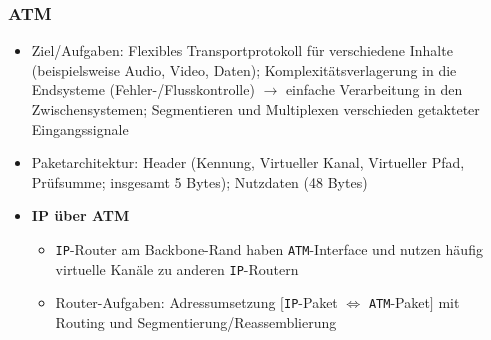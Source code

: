 \subsubsection{ATM}
\begin{itemize}
	\item Ziel/Aufgaben: Flexibles Transportprotokoll für verschiedene Inhalte (beispielsweise Audio, Video, Daten); Komplexitätsverlagerung in die Endsysteme (Fehler-/Flusskontrolle) \(\rightarrow\) einfache Verarbeitung in den Zwischensystemen; Segmentieren und Multiplexen verschieden getakteter Eingangssignale
	\item Paketarchitektur: Header (Kennung, Virtueller Kanal, Virtueller Pfad, Prüfsumme; insgesamt 5 Bytes); Nutzdaten (48 Bytes)
	\item \textbf{IP über ATM}
	\begin{itemize}
		\item \texttt{IP}-Router am Backbone-Rand haben \texttt{ATM}-Interface und nutzen häufig virtuelle Kanäle zu anderen \texttt{IP}-Routern
		\item Router-Aufgaben: Adressumsetzung \(\big\lbrack\)\texttt{IP}-Paket \(\Leftrightarrow\) \texttt{ATM}-Paket\(\big\rbrack\) mit Routing und Segmentierung/Reassemblierung
	\end{itemize}
\end{itemize}

